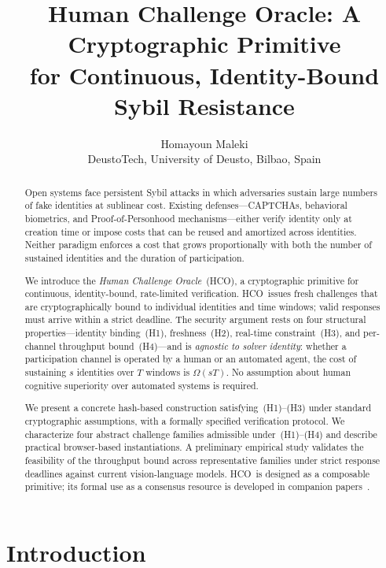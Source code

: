 \documentclass[11pt]{article}
\title{Human Challenge Oracle: A Cryptographic Primitive\\
	for Continuous, Identity-Bound Sybil Resistance}
\author{Homayoun Maleki\\
	DeustoTech, University of Deusto, Bilbao, Spain}
\date{}
\newcommand{\HCO}{HCO\xspace}
\theoremstyle{remark}
\theoremstyle{plain}
\begin{document}
	
	\maketitle
	
	\begin{abstract}
		Open systems face persistent Sybil attacks in which adversaries sustain large
		numbers of fake identities at sublinear cost. Existing defenses---CAPTCHAs,
		behavioral biometrics, and Proof-of-Personhood mechanisms---either verify
		identity only at creation time or impose costs that can be reused and amortized
		across identities. Neither paradigm enforces a cost that grows proportionally
		with both the number of sustained identities and the duration of participation.
		
		We introduce the \emph{Human Challenge Oracle}~(\HCO), a cryptographic
		primitive for continuous, identity-bound, rate-limited verification. \HCO\
		issues fresh challenges that are cryptographically bound to individual
		identities and time windows; valid responses must arrive within a strict
		deadline. The security argument rests on four structural
		properties---identity binding~(H1), freshness~(H2), real-time
		constraint~(H3), and per-channel throughput bound~(H4)---and is
		\emph{agnostic to solver identity}: whether a participation channel is
		operated by a human or an automated agent, the cost of sustaining $s$
		identities over $T$ windows is $\Omega(sT)$. No assumption about human
		cognitive superiority over automated systems is required.
		
		We present a concrete hash-based construction satisfying~(H1)--(H3)
		under standard cryptographic assumptions, with a formally specified
		verification protocol. We characterize four abstract challenge families
		admissible under~(H1)--(H4) and describe practical browser-based
		instantiations. A preliminary empirical study validates the feasibility
		of the throughput bound across representative families under strict
		response deadlines against current vision-language models. \HCO\ is
		designed as a composable primitive; its formal use as a consensus
		resource is developed in companion
		papers~\cite{maleki2026pocmt,maleki2026geometry}.
	\end{abstract}
	
	
	\section{Introduction}
	\label{sec:intro}
	
\end{document}
